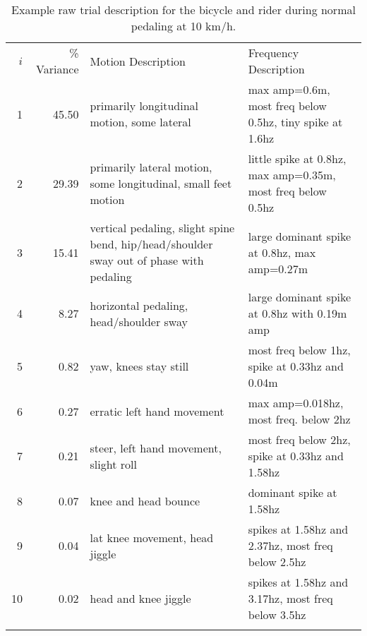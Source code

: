 \documentclass[smallextended]{svjour3}     %
\begin{document}
\begin{table}
    \caption{Example raw trial description for the bicycle and rider during normal pedaling at 10 km/h.}
    \label{tab:trialDesc}
    \centering
    {\small
	\begin{tabular}{rrp{40mm}p{40mm}}
	\hline\noalign{\smallskip}
        $i$ & \% Variance & Motion Description & Frequency Description\\
        \noalign{\smallskip}\hline\noalign{\smallskip}
        1  & 45.50 & primarily longitudinal motion, some lateral & max amp=0.6m, most freq below 0.5hz, tiny spike at 1.6hz\\
        2  & 29.39 & primarily lateral motion, some longitudinal, small feet motion & little spike at 0.8hz, max amp=0.35m, most freq below 0.5hz\\
        3  & 15.41 & vertical pedaling, slight spine bend, hip/head/shoulder sway out of phase with pedaling & large dominant spike at 0.8hz, max amp=0.27m\\
        4  & 8.27  & horizontal pedaling, head/shoulder sway & large dominant spike at 0.8hz with 0.19m amp\\
        5  & 0.82  & yaw, knees stay still & most freq below 1hz, spike at 0.33hz and 0.04m\\
        6  & 0.27  & erratic left hand movement & max amp=0.018hz, most freq. below 2hz\\
        7  & 0.21  & steer, left hand movement, slight roll & most freq below 2hz, spike at 0.33hz and 1.58hz\\
        8  & 0.07  & knee and head bounce & dominant spike at 1.58hz\\
        9  & 0.04  & lat knee movement, head jiggle & spikes at 1.58hz and 2.37hz, most freq below 2.5hz\\
        10 & 0.02  & head and knee jiggle & spikes at 1.58hz and 3.17hz, most freq below 3.5hz\\
	\noalign{\smallskip}\hline
        \end{tabular}
    }

\end{table}
\end{document}
